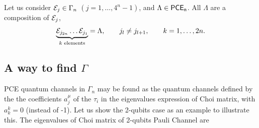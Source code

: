 Let us consider $\mathcal{E}_j\in\Gamma_n$ $(j=1,\ldots,4^{n}-1)$,
and $\Lambda\in\mathsf{PCE}_\mathsf{n}$. All $\Lambda$ are a composition of 
$\mathcal{E}_j$,
\begin{equation}\label{eq:PCE-characterization}
\underbrace{\mathcal{E}_{j_{2n}}\ldots\mathcal{E}_{j_1}}_{k\text{ elements}}=\Lambda,
\hspace{20pt}
j_l\neq j_{l+1},
\hspace{20pt}
k=1,\ldots,2n.
\end{equation}
\subsection*{A way to find $\Gamma$} %
PCE quantum channels in $\Gamma_n$ may be found as the quantum 
channels defined by the the coefficients $a_j^{\mu}$ of the $\tau_i$
in the eigenvalues expression of Choi matrix, with $a^{k}_{k}=0$ 
(instead of -1). Let us show the 2-qubits case as an example to illustrate this. 
The eigenvalues of Choi matrix of 2-qubits Pauli Channel are

